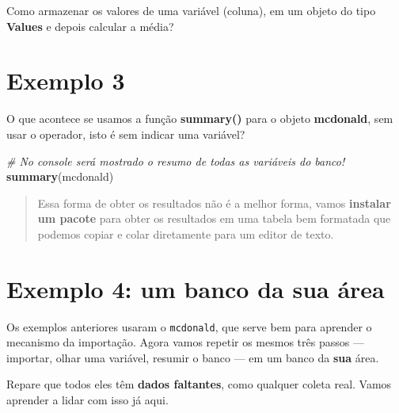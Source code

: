 \documentclass[
]{book}
\newenvironment{Shaded}{\begin{snugshade}}{\end{snugshade}}
\newcommand{\CommentTok}[1]{\textcolor[rgb]{0.56,0.35,0.01}{\textit{#1}}}
\newcommand{\FunctionTok}[1]{\textcolor[rgb]{0.13,0.29,0.53}{\textbf{#1}}}
\newcommand{\NormalTok}[1]{#1}
\newcommand{\OtherTok}[1]{\textcolor[rgb]{0.56,0.35,0.01}{#1}}
\newcommand{\SpecialCharTok}[1]{\textcolor[rgb]{0.81,0.36,0.00}{\textbf{#1}}}
\begin{document}
Como armazenar os valores de uma variável (coluna), em um objeto do tipo \textbf{Values} e depois calcular a média?

\begin{Shaded}
\end{Shaded}

\section{Exemplo 3}\label{exemplo-3-1}

O que acontece se usamos a função \textbf{summary()} para o objeto \textbf{mcdonald}, sem usar o operador, isto é sem indicar uma variável?

\begin{Shaded}
\begin{Highlighting}[]
\CommentTok{\# No console será mostrado o resumo de todas as variáveis do banco!}
\FunctionTok{summary}\NormalTok{(mcdonald)}
\end{Highlighting}
\end{Shaded}

\begin{quote}
Essa forma de obter os resultados não é a melhor forma, vamos \textbf{instalar um pacote} para obter os resultados em uma tabela bem formatada que podemos copiar e colar diretamente para um editor de texto.
\end{quote}

\section{Exemplo 4: um banco da sua área}\label{exemplo-4-um-banco-da-sua-uxe1rea}

Os exemplos anteriores usaram o \texttt{mcdonald}, que serve bem para aprender o mecanismo da importação. Agora vamos repetir os mesmos três passos --- importar, olhar uma variável, resumir o banco --- em um banco da \textbf{sua} área.

Repare que todos eles têm \textbf{dados faltantes}, como qualquer coleta real. Vamos aprender a lidar com isso já aqui.
\end{document}
